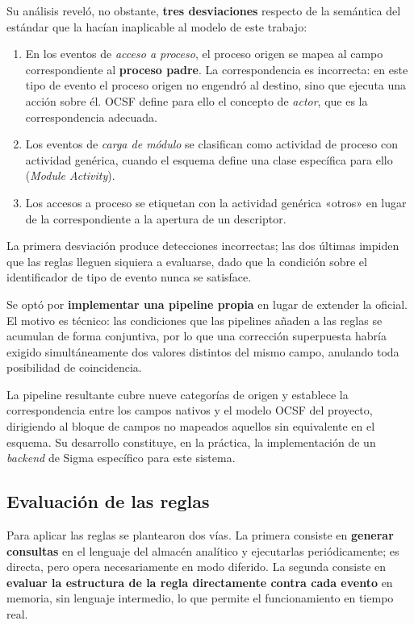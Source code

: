 Su análisis reveló, no obstante, \textbf{tres desviaciones} respecto de la semántica del
estándar que la hacían inaplicable al modelo de este trabajo:

\begin{enumerate}
    \item En los eventos de \textit{acceso a proceso}, el proceso origen se mapea al campo
    correspondiente al \textbf{proceso padre}. La correspondencia es incorrecta: en este tipo
    de evento el proceso origen no engendró al destino, sino que ejecuta una acción sobre él.
    OCSF define para ello el concepto de \textit{actor}, que es la correspondencia adecuada.
    \item Los eventos de \textit{carga de módulo} se clasifican como actividad de proceso con
    actividad genérica, cuando el esquema define una clase específica para ello
    (\textit{Module Activity}).
    \item Los accesos a proceso se etiquetan con la actividad genérica «otros» en lugar de la
    correspondiente a la apertura de un descriptor.
\end{enumerate}

La primera desviación produce detecciones incorrectas; las dos últimas impiden que las reglas
lleguen siquiera a evaluarse, dado que la condición sobre el identificador de tipo de evento
nunca se satisface.

Se optó por \textbf{implementar una pipeline propia} en lugar de extender la oficial. El
motivo es técnico: las condiciones que las pipelines añaden a las reglas se acumulan de forma
conjuntiva, por lo que una corrección superpuesta habría exigido simultáneamente dos valores
distintos del mismo campo, anulando toda posibilidad de coincidencia.

La pipeline resultante cubre nueve categorías de origen y establece la correspondencia entre
los campos nativos y el modelo OCSF del proyecto, dirigiendo al bloque de campos no mapeados
aquellos sin equivalente en el esquema. Su desarrollo constituye, en la práctica, la
implementación de un \textit{backend} de Sigma específico para este sistema.

\subsection{Evaluación de las reglas}

Para aplicar las reglas se plantearon dos vías. La primera consiste en \textbf{generar
consultas} en el lenguaje del almacén analítico y ejecutarlas periódicamente; es directa,
pero opera necesariamente en modo diferido. La segunda consiste en \textbf{evaluar la
estructura de la regla directamente contra cada evento} en memoria, sin lenguaje intermedio,
lo que permite el funcionamiento en tiempo real.

